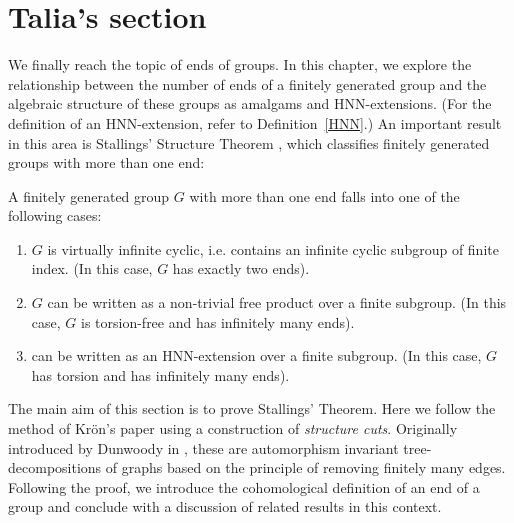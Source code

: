 \newpage %
\section{Talia's section}


We finally reach the topic of ends of groups. In this chapter, we explore the relationship between the number of ends of a finitely generated group and the algebraic structure of these groups as amalgams and HNN-extensions. (For the definition of an HNN-extension, refer to Definition~\ref{HNN}.) An important result in this area is Stallings’ Structure Theorem \cite[p.~4]{S71}, which classifies finitely generated groups with more than one end:

\begin{theorem} %
\label{SST}
A finitely generated group \(G\) with more than one end falls into one of the following cases:
    \begin{enumerate}
        \item \(G\) is virtually infinite cyclic, i.e. contains an infinite cyclic subgroup of finite index. (In this case, \(G\) has exactly two ends).
        \item \(G\) can be written as a non-trivial free product over a finite subgroup. (In this case, \(G\) is torsion-free and has infinitely many ends).
        \item can be written as an HNN-extension over a finite subgroup. (In this case, \(G\) has torsion and has infinitely many ends).
    \end{enumerate}
\end{theorem}

The main aim of this section is to prove Stallings' Theorem.  Here we follow the method of Kr{\"o}n's paper \cite{K10} using a construction of \emph{structure cuts}. Originally introduced by Dunwoody in \cite{D79}, these are automorphism invariant tree-decompositions of graphs based on the principle of removing finitely many edges. %
Following the proof, we introduce the cohomological definition of an end of a group and conclude with a discussion of related results in this context. %

